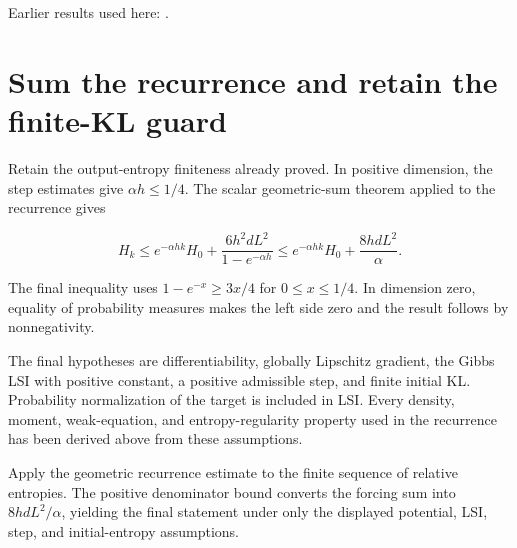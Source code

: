 \documentclass[11pt,a4paper]{article}
\begin{document}
Earlier results used here: \cite[Section~3.26.3]{LangevinLean2026ULASC}.

\section{\texorpdfstring{Sum the recurrence and retain the finite-KL guard}{Sum the recurrence and retain the finite-KL guard}}


Retain the output-entropy finiteness already proved. In positive dimension, the step estimates give \(\alpha h\le1/4\). The scalar geometric-sum theorem applied to the recurrence gives

\[H_k\le e^{-\alpha hk}H_0+\frac{6h^2dL^2}{1-e^{-\alpha h}}\le e^{-\alpha hk}H_0+\frac{8hdL^2}{\alpha}.\]

The final inequality uses \(1-e^{-x}\ge3x/4\) for \(0\le x\le1/4\). In dimension zero, equality of probability measures makes the left side zero and the result follows by nonnegativity.



The final hypotheses are differentiability, globally Lipschitz gradient, the Gibbs LSI with positive constant, a positive admissible step, and finite initial KL. Probability normalization of the target is included in LSI. Every density, moment, weak-equation, and entropy-regularity property used in the recurrence has been derived above from these assumptions.



Apply the geometric recurrence estimate to the finite sequence of relative entropies. The positive denominator bound converts the forcing sum into \(8hdL^2/\alpha\), yielding the final statement under only the displayed potential, LSI, step, and initial-entropy assumptions.
\end{document}

